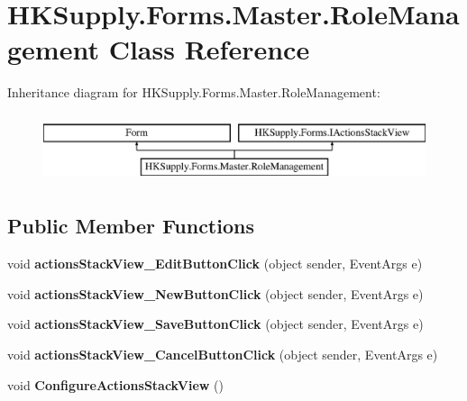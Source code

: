 \hypertarget{class_h_k_supply_1_1_forms_1_1_master_1_1_role_management}{}\section{H\+K\+Supply.\+Forms.\+Master.\+Role\+Management Class Reference}
\label{class_h_k_supply_1_1_forms_1_1_master_1_1_role_management}
Inheritance diagram for H\+K\+Supply.\+Forms.\+Master.\+Role\+Management\+:\begin{figure}[H]
\begin{center}
\leavevmode
\includegraphics[height=2.000000cm]{class_h_k_supply_1_1_forms_1_1_master_1_1_role_management}
\end{center}
\end{figure}
\subsection*{Public Member Functions}
\begin{DoxyCompactItemize}
\item 
\mbox{\label{class_h_k_supply_1_1_forms_1_1_master_1_1_role_management_a029527589b55752c810c410fb7b7ec73}} 
void {\bfseries actions\+Stack\+View\+\_\+\+Edit\+Button\+Click} (object sender, Event\+Args e)
\item 
\mbox{\label{class_h_k_supply_1_1_forms_1_1_master_1_1_role_management_a9cee7b3dda5de12cd3612ad66b27e302}} 
void {\bfseries actions\+Stack\+View\+\_\+\+New\+Button\+Click} (object sender, Event\+Args e)
\item 
\mbox{\label{class_h_k_supply_1_1_forms_1_1_master_1_1_role_management_a6f9ce17d9dbd5e01886e7ffebb428cac}} 
void {\bfseries actions\+Stack\+View\+\_\+\+Save\+Button\+Click} (object sender, Event\+Args e)
\item 
\mbox{\label{class_h_k_supply_1_1_forms_1_1_master_1_1_role_management_a9651949eef33db6a0600a919bb30f8e8}} 
void {\bfseries actions\+Stack\+View\+\_\+\+Cancel\+Button\+Click} (object sender, Event\+Args e)
\item 
\mbox{\label{class_h_k_supply_1_1_forms_1_1_master_1_1_role_management_a022e071b082ef46f206426f75db34fa8}} 
void {\bfseries Configure\+Actions\+Stack\+View} ()
\end{DoxyCompactItemize}
